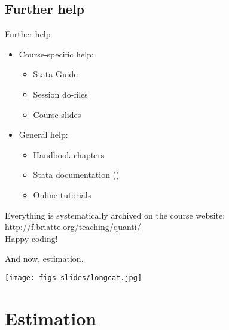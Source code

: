 \documentclass{beamer}
\begin{document}
	\subsection{Further help}
	
	\begin{frame}[t]{Further help}

		\begin{itemize}

			\item Course-specific help:

			\begin{itemize}
				\item Stata Guide
				\item Session do-files
				\item Course slides
			\end{itemize}
	
			\item General help:
			
			\begin{itemize}
				\item Handbook chapters
				\item Stata documentation ()
				\item Online tutorials
			\end{itemize}

		\end{itemize}

		Everything is systematically archived on the course website:\\[.5em]
		
		\url{http://f.briatte.org/teaching/quanti/}\\[.5em]
		
		Happy coding!
		
	\end{frame}


	\begin{frame}[t,plain]
		
		\vspace{.4\textheight} 
		And now, estimation.
		
		\begin{flushright}
		\texttt{[image: figs-slides/longcat.jpg]}		
		\end{flushright}
	\end{frame}
		
	\section{Estimation}
\end{document}
